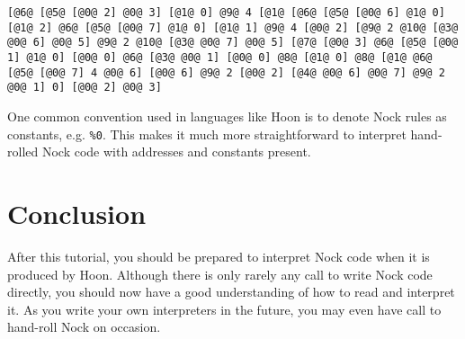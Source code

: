\documentclass[twoside]{article}
\begin{document}
\begin{lstlisting}[style=listingcode]
[@6@ [@5@ [@0@ 2] @0@ 3] [@1@ 0] @9@ 4 [@1@ [@6@ [@5@ [@0@ 6] @1@ 0] [@1@ 2] @6@ [@5@ [@0@ 7] @1@ 0] [@1@ 1] @9@ 4 [@0@ 2] [@9@ 2 @10@ [@3@ @0@ 6] @0@ 5] @9@ 2 @10@ [@3@ @0@ 7] @0@ 5] [@7@ [@0@ 3] @6@ [@5@ [@0@ 1] @1@ 0] [@0@ 0] @6@ [@3@ @0@ 1] [@0@ 0] @8@ [@1@ 0] @8@ [@1@ @6@ [@5@ [@0@ 7] 4 @0@ 6] [@0@ 6] @9@ 2 [@0@ 2] [@4@ @0@ 6] @0@ 7] @9@ 2 @0@ 1] 0] [@0@ 2] @0@ 3]
\end{lstlisting}

One common convention used in languages like Hoon is to denote Nock rules as constants, e.g. \@\lstinline[style=inlinecode]{%0}.  This makes it much more straightforward to interpret hand-rolled Nock code with addresses and constants present.

\section{Conclusion}

After this tutorial, you should be prepared to interpret Nock code when it is produced by Hoon.  Although there is only rarely any call to write Nock code directly, you should now have a good understanding of how to read and interpret it.  As you write your own interpreters in the future, you may even have call to hand-roll Nock on occasion.

\end{document}
